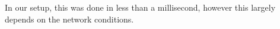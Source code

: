 In our setup, this was done in less than a millisecond, however this largely depends on the network conditions.